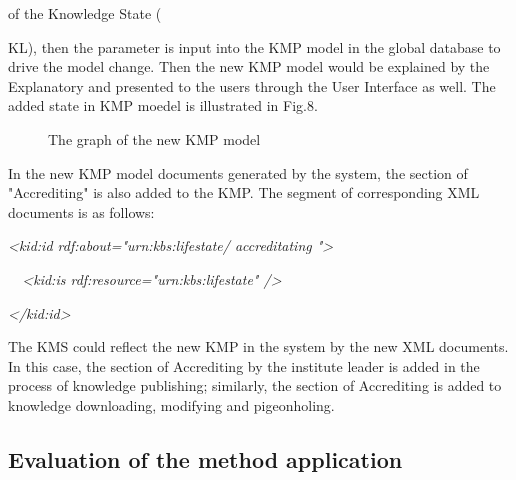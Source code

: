 \documentclass{elsarticle}
\begin{document}
of the Knowledge State ({KL), then the
parameter is input into the KMP model in the global database to drive
the model change. Then the new KMP model would be explained by
the Explanatory and presented to the users through the User Interface
as well. The added state in KMP moedel is illustrated in Fig.8.


  \begin{figure}[ht]
    \centering
    \scalebox{0.75}{\texttt{[image: 08]}}
    \caption{ The graph of the new KMP model}
  \end{figure}



In the new KMP model documents generated by the system, the section of
"Accrediting" is also added to the KMP. The
segment of corresponding XML documents is as follows:

{\itshape
{\textless}kid:id rdf:about="urn:kbs:lifestate/
accreditating "{\textgreater}}

{\itshape
\ \ {\textless}kid:is
rdf:resource="urn:kbs:lifestate"
/{\textgreater}}

{\itshape
{\textless}/kid:id{\textgreater}}

{
The KMS could reflect the new KMP in the system by the new XML
documents. In this case, the section of Accrediting by the institute
leader is added in the process of knowledge publishing; similarly, the
section of Accrediting is added to knowledge downloading, modifying and
pigeonholing.}

\subsection{ Evaluation of the method application}
\label{sec:eval-meth-appl-1}

}
\end{document}
